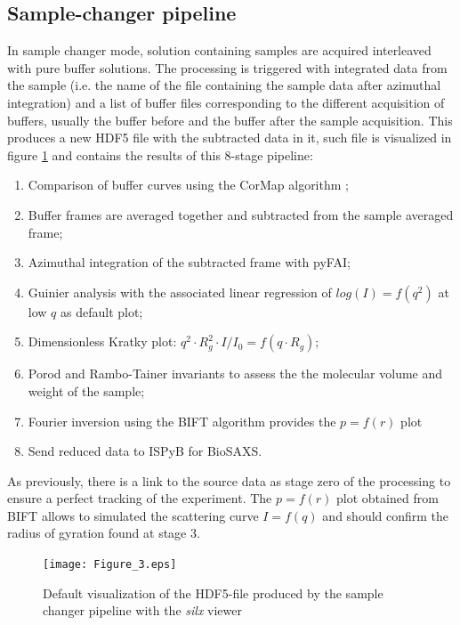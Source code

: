 \documentclass[preprint]{iucr}              %
\begin{document}
\subsection{Sample-changer pipeline}
\label{sc-pipeline}
In sample changer mode, solution containing samples are acquired interleaved with pure buffer solutions.
The processing is triggered with integrated data from the sample (i.e. the name of the file containing the sample data after azimuthal integration) and a list of 
buffer files corresponding to the different acquisition of buffers, usually the buffer before and the buffer after the sample acquisition. 
This produces a new HDF5 file with the subtracted data in it, such file is visualized in figure \ref{subtracted}
and contains the results of this 8-stage pipeline: 
\begin{enumerate}
    \item Comparison of buffer curves using the CorMap algorithm \cite{CorMap};
    \item Buffer frames are averaged together and subtracted from the sample averaged frame;
    \item Azimuthal integration of the subtracted frame with pyFAI;
    \item Guinier analysis with the associated linear regression of $log(I) = f(q^2)$ at low $q$ as default plot;
    \item Dimensionless Kratky plot: $q^2\cdot R_g^2\cdot I/I_0 = f(q\cdot R_g)$;
    \item Porod \cite{glatter+kratky} and Rambo-Tainer invariants \cite{RamboTainerNature2013} to assess the the molecular volume and weight of the sample;
    \item Fourier inversion using the BIFT algorithm \cite{bift} provides the $p=f(r)$ plot
    \item Send reduced data to ISPyB for BioSAXS.
\end{enumerate}
As previously, there is a link to the source data as stage zero of the processing to ensure a perfect tracking of the experiment.
The $p=f(r)$ plot obtained from BIFT allows to simulated the scattering curve $I=f(q)$ and should confirm the radius of gyration found at stage 3.

\begin{figure}
\label{subtracted}
\begin{center}
\texttt{[image: Figure\_3.eps]}
\caption{Default visualization of the HDF5-file produced by the sample changer pipeline with the \textit{silx} viewer}
\end{center}
\end{figure}
\end{document}
